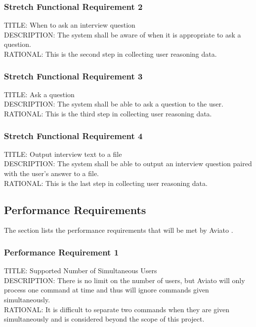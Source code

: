 \documentclass[onecolumn, draftclsnofoot,10pt, compsoc]{IEEEtran}
\def \botname{Aviato }
\begin{document}
        \subsubsection{Stretch Functional Requirement 2}
        TITLE: When to ask an interview question \\
        DESCRIPTION: The system shall be aware of when it is appropriate to ask a question. \\
        RATIONAL: This is the second step in collecting user reasoning data. 
        
        \subsubsection{Stretch Functional Requirement 3}
        TITLE: Ask a question \\
        DESCRIPTION: The system shall be able to ask a question to the user. \\
        RATIONAL: This is the third step in collecting user reasoning data. 
        
        \subsubsection{Stretch Functional Requirement 4}
        TITLE: Output interview text to a file \\
        DESCRIPTION: The system shall be able to output an interview question paired with the user's answer to a file. \\
        RATIONAL: This is the last step in collecting user reasoning data. 
        

    \subsection{Performance Requirements}
        The section lists the performance requirements that will be met by \botname.
        
        \subsubsection{Performance Requirement 1}
        TITLE: Supported Number of Simultaneous Users \\
        DESCRIPTION: There is no limit on the number of users, but \botname will only process one command at time and thus will ignore commands given simultaneously. \\
        RATIONAL: It is difficult to separate two commands when they are given simultaneously and is considered beyond the scope of this project.
        
\end{document}
